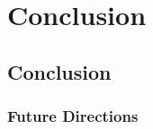 \documentclass[12pt,oneside,final]{thesis}\usepackage[]{graphicx}\usepackage[]{color}
\begin{document}
\chapter{Conclusion}
\label{sec:conclusion}

\section{Conclusion}
\subsection{Future Directions}








% 
% 
% 
% 
% 
\end{document}
